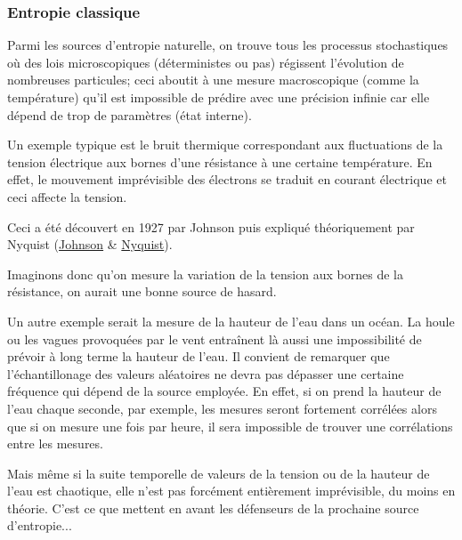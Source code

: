 \documentclass{scrartcl}
\begin{document}
\subsubsection{Entropie classique}
Parmi les sources d’entropie naturelle, on trouve tous les processus stochastiques où des lois microscopiques (déterministes ou pas) régissent l'évolution de nombreuses particules; ceci aboutit à une mesure macroscopique (comme la température) qu’il est impossible de prédire avec une précision infinie car elle dépend de trop de paramètres (état interne). \par
Un exemple typique est le bruit thermique correspondant aux fluctuations de la tension électrique aux bornes d’une résistance à une certaine température. En effet, le mouvement imprévisible des électrons se traduit en courant électrique et ceci affecte la tension. \par
Ceci a été découvert en 1927 par Johnson puis expliqué théoriquement par Nyquist (\href{https://journals.aps.org/pr/abstract/10.1103/PhysRev.32.97}{Johnson} \& \href{https://journals.aps.org/pr/abstract/10.1103/PhysRev.32.110}{Nyquist}). \par
Imaginons donc qu’on mesure la variation de la tension aux bornes de la résistance, on aurait une bonne source de hasard. \par
Un autre exemple serait la mesure de la hauteur de l'eau dans un océan. La houle ou les vagues provoquées par le vent entraînent là aussi une impossibilité de prévoir à long terme la hauteur de l'eau. Il convient de remarquer que l'échantillonage des valeurs aléatoires ne devra pas dépasser une certaine fréquence qui dépend de la source employée. En effet, si on prend la hauteur de l'eau chaque seconde, par exemple, les mesures seront fortement corrélées alors que si on mesure une fois par heure, il sera impossible de trouver une corrélations entre les mesures.\par
Mais même si la suite temporelle de valeurs de la tension ou de la hauteur de l'eau est chaotique, elle n'est pas forcément entièrement imprévisible, du moins en théorie. C'est ce que mettent en avant les défenseurs de la prochaine source d'entropie...
\end{document}
